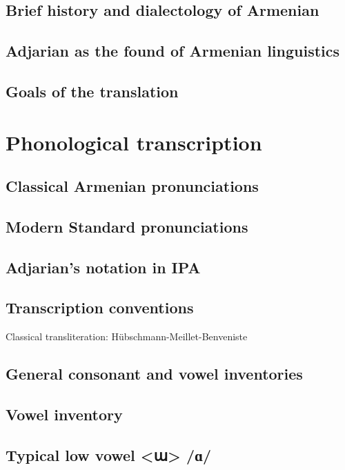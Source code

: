 \subsection{Brief history and dialectology  of Armenian}
\subsection{Adjarian as the found of Armenian linguistics}
\subsection{Goals of the translation}






\section{Phonological transcription}



\subsection{Classical Armenian pronunciations}

\subsection{Modern Standard pronunciations}
\subsection{Adjarian's notation in IPA}

\subsection{Transcription conventions}

Classical transliteration: Hübschmann-Meillet-Benveniste

\subsection{General consonant and vowel inventories}

\subsection{Vowel inventory}


\subsection{Typical low vowel <ա>  /ɑ/}


